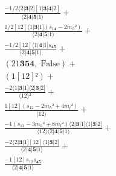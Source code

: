 \documentclass[varwidth, border=5pt]{standalone}
\begin{document}
\begin{my}
$\begin{gathered}
\scriptscriptstyle\frac{-1/2⟨2|𝟑|2][1|𝟑|𝟒|2]}{⟨2|𝟒|𝟓|1⟩} +\\
\scriptscriptstyle\frac{1/2[12]⟨1|𝟑|1](s_{1𝟒}-2m_h²)}{⟨2|𝟒|𝟓|1⟩} +\\
\scriptscriptstyle\frac{-1/2[12]⟨1|𝟒|1]s_{𝟒𝟓}}{⟨2|𝟒|𝟓|1⟩} +\\
\scriptscriptstyle(21𝟑𝟓𝟒,\;\text{False}) +\\
\scriptscriptstyle (1[12]²) +\\
\scriptscriptstyle\frac{-2⟨1|𝟑|1]⟨2|𝟑|2]}{⟨12⟩²} +\\
\scriptscriptstyle\frac{1[12](s_{12}-2m_h²+4m_t²)}{⟨12⟩} +\\
\scriptscriptstyle\frac{-1(s_{12}-3m_h²+8m_t²)⟨2|𝟑|1]⟨1|𝟑|2]}{⟨12⟩⟨2|𝟒|𝟓|1⟩} +\\
\scriptscriptstyle\frac{-2⟨2|𝟑|1][12]⟨1|𝟑|2]}{⟨2|𝟒|𝟓|1⟩} +\\
\scriptscriptstyle\frac{-1[12]s_{12}s_{𝟒𝟓}}{⟨2|𝟒|𝟓|1⟩} \phantom{+}
\end{gathered}$
\end{my}
\end{document}
